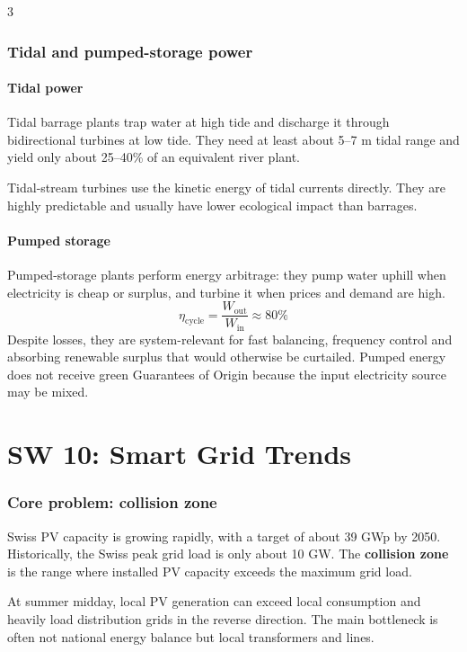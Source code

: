 \documentclass[9pt, landscape, a4paper]{article}
\begin{document}
\begin{multicols*}{3}
\section{Tidal and pumped-storage power}
\subsection{Tidal power}
Tidal barrage plants trap water at high tide and discharge it through
bidirectional turbines at low tide. They need at least about 5--7 m tidal range
and yield only about 25--40\% of an equivalent river plant.

Tidal-stream turbines use the kinetic energy of tidal currents directly. They
are highly predictable and usually have lower ecological impact than barrages.

\subsection{Pumped storage}
Pumped-storage plants perform energy arbitrage: they pump water uphill when
electricity is cheap or surplus, and turbine it when prices and demand are
high.
\[
  \eta_{\mathrm{cycle}}
  =\frac{W_{\mathrm{out}}}{W_{\mathrm{in}}}
  \approx80\%
\]
Despite losses, they are system-relevant for fast balancing, frequency control
and absorbing renewable surplus that would otherwise be curtailed. Pumped
energy does not receive green Guarantees of Origin because the input
electricity source may be mixed.

\part{SW 10: Smart Grid Trends}
\section{Core problem: collision zone}
Swiss PV capacity is growing rapidly, with a target of about 39 GWp by 2050.
Historically, the Swiss peak grid load is only about 10 GW. The
\textbf{collision zone} is the range where installed PV capacity exceeds the
maximum grid load.

At summer midday, local PV generation can exceed local consumption and heavily
load distribution grids in the reverse direction. The main bottleneck is often
not national energy balance but local transformers and lines.


\end{multicols*}
\end{document}
